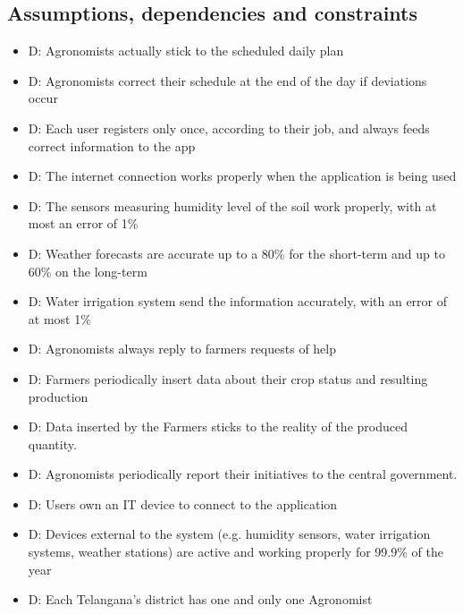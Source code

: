 \documentclass[table, 12pt]{article}
\begin{document}
\subsection{Assumptions, dependencies and constraints}
\begin{itemize}
    \item {}D: Agronomists actually stick to the scheduled daily plan
    \item {}D: Agronomists correct their schedule at the end of the day if deviations occur
    \item {}D: Each user registers only once, according to their job, and always feeds correct information to the app
    \item {}D: The internet connection works properly when the application is being used\footnotemark
    \item {}D: The sensors measuring humidity level of the soil work properly, with at most an error of 1\%
    \item {}D: Weather forecasts are accurate up to a 80\% for the short-term and up to 60\% on the long-term
    \item {}D: Water irrigation system send the information accurately, with an error of at most 1\%
    \item {}D: Agronomists always reply to farmers requests of help
    \item {}D: Farmers periodically insert data about their crop status and resulting production
    \item {}D: Data inserted by the Farmers sticks to the reality of the produced quantity.
    \item {}D: Agronomists periodically report their initiatives to the central government.
    \item {}D: Users own an IT device to connect to the application
    \item {}D: Devices external to the system (e.g. humidity sensors, water irrigation systems, weather stations) are active and working properly for 99.9\% of the year
    \item {}D: Each Telangana's district has one and only one Agronomist
\end{itemize}
\newpage
\end{document}
